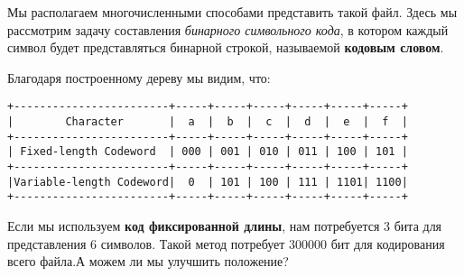 \vspace{\baselineskip}
Мы располагаем многочисленными способами представить такой файл. Здесь мы рассмотрим задачу составления {\itshape бинарного символьного кода}, в котором каждый символ будет представляться бинарной строкой, называемой \textbf{
кодовым словом}. 


\vspace{\baselineskip}
Благодаря построенному дереву мы видим, что:

\vspace{\baselineskip}
\begin{tcolorbox}
\begin{verbatim}
+------------------------+-----+-----+-----+-----+-----+-----+
|        Character       |  a  |  b  |  c  |  d  |  e  |  f  |
+------------------------+-----+-----+-----+-----+-----+-----+
| Fixed-length Codeword  | 000 | 001 | 010 | 011 | 100 | 101 |
+------------------------+-----+-----+-----+-----+-----+-----+
|Variable-length Codeword|  0  | 101 | 100 | 111 | 1101| 1100|
+------------------------+-----+-----+-----+-----+-----+-----+
\end{verbatim}
\end{tcolorbox}

\vspace{\baselineskip} Если мы используем \textbf{код фиксированной длины}, нам потребуется 3 бита для представления 6 символов. Такой метод потребует 300000 бит для кодирования всего файла.А можем ли мы улучшить положение?